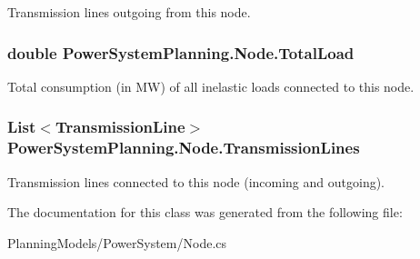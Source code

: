 Transmission lines outgoing from this node. 

\subsubsection[{\texorpdfstring{Total\+Load}{TotalLoad}}]{\setlength{\rightskip}{0pt plus 5cm}double Power\+System\+Planning.\+Node.\+Total\+Load\hspace{0.3cm}{\ttfamily [get]}}\hypertarget{class_power_system_planning_1_1_node_a5ad80ac9ed391e904c9cf4011c7ba00d}{}\label{class_power_system_planning_1_1_node_a5ad80ac9ed391e904c9cf4011c7ba00d}


Total consumption (in MW) of all inelastic loads connected to this node. 

\subsubsection[{\texorpdfstring{Transmission\+Lines}{TransmissionLines}}]{\setlength{\rightskip}{0pt plus 5cm}List$<${\bf Transmission\+Line}$>$ Power\+System\+Planning.\+Node.\+Transmission\+Lines\hspace{0.3cm}{\ttfamily [get]}}\hypertarget{class_power_system_planning_1_1_node_a99a60d0b8c6efda899676fd86417162f}{}\label{class_power_system_planning_1_1_node_a99a60d0b8c6efda899676fd86417162f}


Transmission lines connected to this node (incoming and outgoing). 



The documentation for this class was generated from the following file\+:\begin{DoxyCompactItemize}
\item 
Planning\+Models/\+Power\+System/Node.\+cs\end{DoxyCompactItemize}

